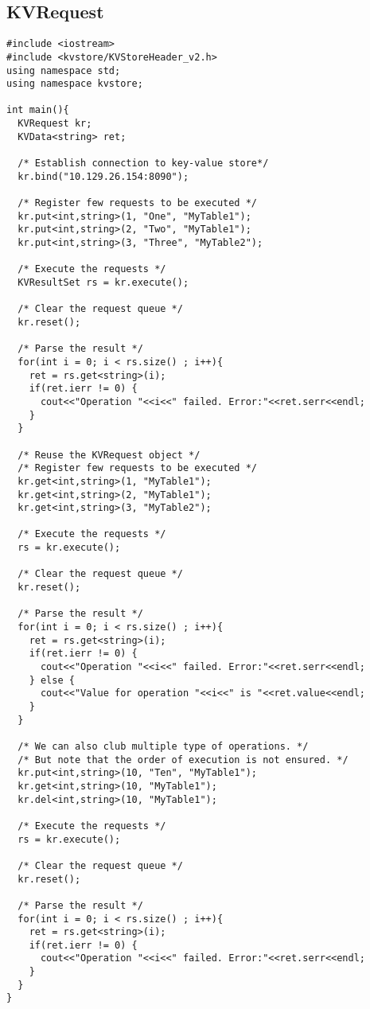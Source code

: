 \documentclass[11pt]{article}
\begin{document}
\subsection{KVRequest}
\begin{lstlisting}
#include <iostream>
#include <kvstore/KVStoreHeader_v2.h>
using namespace std;
using namespace kvstore;

int main(){
  KVRequest kr;
  KVData<string> ret;
  
  /* Establish connection to key-value store*/
  kr.bind("10.129.26.154:8090");
  
  /* Register few requests to be executed */
  kr.put<int,string>(1, "One", "MyTable1");
  kr.put<int,string>(2, "Two", "MyTable1");
  kr.put<int,string>(3, "Three", "MyTable2");
  
  /* Execute the requests */
  KVResultSet rs = kr.execute();
  
  /* Clear the request queue */
  kr.reset();
  
  /* Parse the result */
  for(int i = 0; i < rs.size() ; i++){
    ret = rs.get<string>(i);
    if(ret.ierr != 0) {
      cout<<"Operation "<<i<<" failed. Error:"<<ret.serr<<endl;
    }
  }
  
  /* Reuse the KVRequest object */
  /* Register few requests to be executed */
  kr.get<int,string>(1, "MyTable1");
  kr.get<int,string>(2, "MyTable1");
  kr.get<int,string>(3, "MyTable2");
  
  /* Execute the requests */
  rs = kr.execute();
  
  /* Clear the request queue */
  kr.reset();
  
  /* Parse the result */
  for(int i = 0; i < rs.size() ; i++){
    ret = rs.get<string>(i);
    if(ret.ierr != 0) {
      cout<<"Operation "<<i<<" failed. Error:"<<ret.serr<<endl;
    } else {
      cout<<"Value for operation "<<i<<" is "<<ret.value<<endl;
    }
  }
  
  /* We can also club multiple type of operations. */
  /* But note that the order of execution is not ensured. */
  kr.put<int,string>(10, "Ten", "MyTable1");
  kr.get<int,string>(10, "MyTable1");
  kr.del<int,string>(10, "MyTable1");
  
  /* Execute the requests */
  rs = kr.execute();
  
  /* Clear the request queue */
  kr.reset();
  
  /* Parse the result */
  for(int i = 0; i < rs.size() ; i++){
    ret = rs.get<string>(i);
    if(ret.ierr != 0) {
      cout<<"Operation "<<i<<" failed. Error:"<<ret.serr<<endl;
    }
  }
}
\end{lstlisting}
\end{document}
